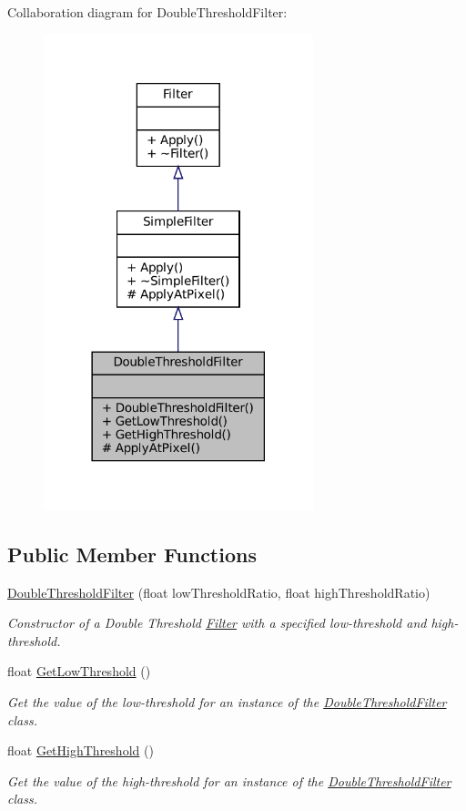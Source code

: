 Collaboration diagram for Double\+Threshold\+Filter\+:\nopagebreak
\begin{figure}[H]
\begin{center}
\leavevmode
\includegraphics[width=222pt]{classDoubleThresholdFilter__coll__graph}
\end{center}
\end{figure}
\subsection*{Public Member Functions}
\begin{DoxyCompactItemize}
\item 
\hyperlink{classDoubleThresholdFilter_abd3b482cd8a1f554e819ced5fe36699f}{Double\+Threshold\+Filter} (float low\+Threshold\+Ratio, float high\+Threshold\+Ratio)
\begin{DoxyCompactList}\small\item\em Constructor of a Double Threshold \hyperlink{classFilter}{Filter} with a specified low-\/threshold and high-\/threshold. \end{DoxyCompactList}\item 
float \hyperlink{classDoubleThresholdFilter_a3417a9655273bcf69280aaee6666d25b}{Get\+Low\+Threshold} ()
\begin{DoxyCompactList}\small\item\em Get the value of the low-\/threshold for an instance of the \hyperlink{classDoubleThresholdFilter}{Double\+Threshold\+Filter} class. \end{DoxyCompactList}\item 
float \hyperlink{classDoubleThresholdFilter_aedbed79b6c46e2a8c76616294ee2be9d}{Get\+High\+Threshold} ()
\begin{DoxyCompactList}\small\item\em Get the value of the high-\/threshold for an instance of the \hyperlink{classDoubleThresholdFilter}{Double\+Threshold\+Filter} class. \end{DoxyCompactList}\end{DoxyCompactItemize}
